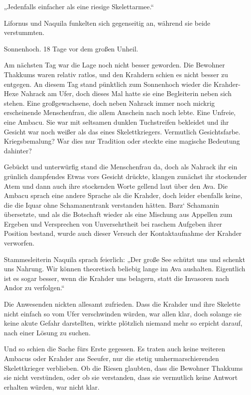 „Jedenfalls einfacher als eine riesige Skelettarmee.“

Lifornus und Naquila funkelten sich gegenseitig an, während sie beide verstummten.\bigskip







Sonnenhoch. 18 Tage vor dem großen Unheil.\bigskip



Am nächsten Tag war die Lage noch nicht besser geworden. Die Bewohner Thakkums waren relativ ratlos, und den Krahdern schien es nicht besser zu entgegen. An diesem Tag stand pünktlich zum Sonnenhoch wieder die Krahder-Hexe Nahrack am Ufer, doch dieses Mal hatte sie eine Begleiterin neben sich stehen. Eine großgewachsene, doch neben Nahrack immer noch mickrig erscheinende Menschenfrau, die allem Anschein nach noch lebte. Eine Unfreie, eine Ambacu. Sie war mit seltsamen dunklen Tuchstreifen bekleidet und ihr Gesicht war noch weißer als das eines Skelettkriegers. Vermutlich Gesichtsfarbe. Kriegsbemalung? War dies nur Tradition oder steckte eine magische Bedeutung dahinter?

Gebückt und unterwürfig stand die Menschenfrau da, doch als Nahrack ihr ein grünlich dampfendes Etwas vors Gesicht drückte, klangen zunächst ihr stockender Atem und dann auch ihre stockenden Worte gellend laut über den Ava. Die Ambacu sprach eine andere Sprache als die Krahder, doch leider ebenfalls keine, die die Iquar ohne Schamanentrank verstanden hätten. Barz‘ Schamanin übersetzte, und als die Botschaft wieder als eine Mischung aus Appellen zum Ergeben und Versprechen von Unversehrtheit bei raschem Aufgeben ihrer Position bestand, wurde auch dieser Versuch der Kontaktaufnahme der Krahder verworfen.

Stammesleiterin Naquila sprach feierlich: „Der große See schützt uns und schenkt uns Nahrung. Wir können theoretisch beliebig lange im Ava aushalten. Eigentlich ist es sogar besser, wenn die Krahder uns belagern, statt die Invasoren nach Andor zu verfolgen.“

Die Anwesenden nickten allesamt zufrieden. Dass die Krahder und ihre Skelette nicht einfach so vom Ufer verschwinden würden, war allen klar, doch solange sie keine akute Gefahr darstellten, wirkte plötzlich niemand mehr so erpicht darauf, nach einer Lösung zu suchen.

Und so schien die Sache fürs Erste gegessen. Es traten auch keine weiteren Ambacus oder Krahder ans Seeufer, nur die stetig umhermarschierenden Skelettkrieger verblieben. Ob die Riesen glaubten, dass die Bewohner Thakkums sie nicht verstünden, oder ob sie verstanden, dass sie vermutlich keine Antwort erhalten würden, war nicht klar.

